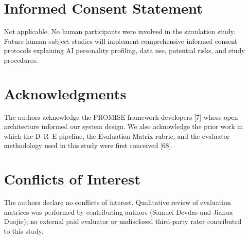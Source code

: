 \section{Informed Consent Statement}\label{informed-consent-statement}

Not applicable. No human participants were involved in the simulation study. Future human subject studies will implement comprehensive informed consent protocols explaining AI personality profiling, data use, potential risks, and study procedures.

\section{Acknowledgments}\label{acknowledgments}

The authors acknowledge the PROMISE framework developers {[}7{]} whose open architecture informed our system design. We also acknowledge the prior work in which the D--R--E pipeline, the Evaluation Matrix rubric, and the evaluator methodology used in this study were first conceived {[}68{]}.

\section{Conflicts of Interest}\label{conflicts-of-interest}

The authors declare no conflicts of interest. Qualitative review of evaluation matrices was performed by contributing authors (Samuel Devdas and Jiahua Duojie); no external paid evaluator or undisclosed third-party rater contributed to this study.

